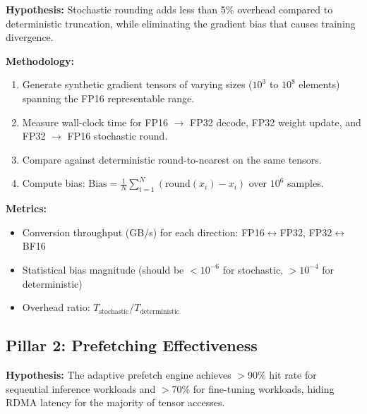 \documentclass[11pt,letterpaper]{article}
\theoremstyle{definition}
\begin{document}
\textbf{Hypothesis:} Stochastic rounding adds less than 5\% overhead compared to deterministic truncation, while eliminating the gradient bias that causes training divergence.

\textbf{Methodology:}
\begin{enumerate}
    \item Generate synthetic gradient tensors of varying sizes ($10^3$ to $10^8$ elements) spanning the FP16 representable range.
    \item Measure wall-clock time for FP16 $\to$ FP32 decode, FP32 weight update, and FP32 $\to$ FP16 stochastic round.
    \item Compare against deterministic round-to-nearest on the same tensors.
    \item Compute bias: $\text{Bias} = \frac{1}{N}\sum_{i=1}^{N} (\text{round}(x_i) - x_i)$ over $10^6$ samples.
\end{enumerate}

\textbf{Metrics:}
\begin{itemize}
    \item Conversion throughput (GB/s) for each direction: FP16$\leftrightarrow$FP32, FP32$\leftrightarrow$BF16
    \item Statistical bias magnitude (should be $< 10^{-6}$ for stochastic, $> 10^{-4}$ for deterministic)
    \item Overhead ratio: $T_{\text{stochastic}} / T_{\text{deterministic}}$
\end{itemize}

\subsection{Pillar 2: Prefetching Effectiveness}

\textbf{Hypothesis:} The adaptive prefetch engine achieves $>$90\% hit rate for sequential inference workloads and $>$70\% for fine-tuning workloads, hiding RDMA latency for the majority of tensor accesses.
\end{document}
